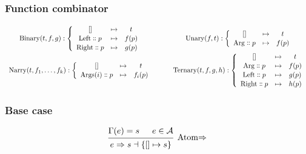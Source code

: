 \documentclass{article}
\newcommand{\Left}{\ensuremath{\mathrm{Left}}}
\newcommand{\Right}{\ensuremath{\mathrm{Right}}}
\newcommand{\Arg}{\ensuremath{\mathrm{Arg}}}
\newcommand{\Args}[1]{\ensuremath{\mathrm{Args}(#1)}}
\DeclareMathOperator{\Binary}{Binary}
\DeclareMathOperator{\Unary}{Unary}
\DeclareMathOperator{\Ternary}{Ternary}
\DeclareMathOperator{\Narry}{Narry}
\renewcommand{\S}{\ensuremath{\Rightarrow}}
\newcommand{\s}[3]{#1 \S{} #2 \dashv{} #3}
\begin{document}
\subsubsection*{Function combinator}
\begin{equation*}
    \renewcommand\arraystretch{1.1}
    \begin{array}{ccc}
        \Binary(t, f, g) : \left\{
        \begin{array}{ccc}
            {[]}               & \mapsto & t     \\
            \Left \dblcolon p  & \mapsto & f (p) \\
            \Right \dblcolon p & \mapsto & g (p)
        \end{array}
        \right.
         & \hspace{1em} &
        \Unary(f, t) : \left\{
        \begin{array}{ccc}
            {[]}             & \mapsto & t     \\
            \Arg \dblcolon p & \mapsto & f (p)
        \end{array}
        \right.
        \\
        \Narry(t, f_1, \dots, f_k) : \left\{
        \begin{array}{ccc}
            {[]}                 & \mapsto & t       \\
            \Args{i} \dblcolon p & \mapsto & f_i (p)
        \end{array}
        \right.
         & \hspace{1em} &
        \Ternary(t, f, g, h) : \left\{
        \begin{array}{ccc}
            {[]}               & \mapsto & t     \\
            \Arg \dblcolon p   & \mapsto & f (p) \\
            \Left \dblcolon p  & \mapsto & g (p) \\
            \Right \dblcolon p & \mapsto & h (p)
        \end{array}
        \right.
    \end{array}
\end{equation*}

\subsubsection*{Base case}

\begin{equation*}
    \begin{prooftree}
        \hypo{\Gamma(e) = s}
        \hypo{e \in \mathcal{A}}
        \infer2[Atom\S]{\s{e}{s}{\{[]\mapsto s\}}}
    \end{prooftree}
\end{equation*}
\end{document}
